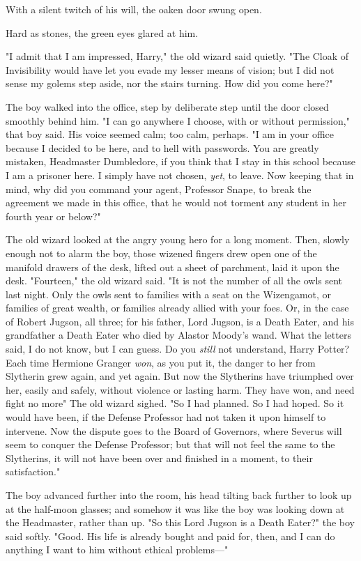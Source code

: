 With a silent twitch of his will, the oaken door swung open.

Hard as stones, the green eyes glared at him.

"I admit that I am impressed, Harry," the old wizard said quietly. "The Cloak
of Invisibility would have let you evade my lesser means of vision; but I did
not sense my golems step aside, nor the stairs turning. How did you come here?"

The boy walked into the office, step by deliberate step until the door closed
smoothly behind him. "I can go anywhere I choose, with or without permission,"
that boy said. His voice seemed calm; too calm, perhaps. "I am in your office
because I decided to be here, and to hell with passwords. You are greatly
mistaken, Headmaster Dumbledore, if you think that I stay in this school
because I am a prisoner here. I simply have not chosen, \emph{yet}, to leave.
Now keeping that in mind, why did you command your agent, Professor Snape, to
break the agreement we made in this office, that he would not torment any
student in her fourth year or below?"

The old wizard looked at the angry young hero for a long moment. Then, slowly
enough not to alarm the boy, those wizened fingers drew open one of the
manifold drawers of the desk, lifted out a sheet of parchment, laid it upon the
desk. "Fourteen," the old wizard said. "It is not the number of all the owls
sent last night. Only the owls sent to families with a seat on the Wizengamot,
or families of great wealth, or families already allied with your foes. Or, in
the case of Robert Jugson, all three; for his father, Lord Jugson, is a Death
Eater, and his grandfather a Death Eater who died by Alastor Moody's wand. What
the letters said, I do not know, but I can guess. Do you \emph{still} not
understand, Harry Potter? Each time Hermione Granger \emph{won}, as you put it,
the danger to her from Slytherin grew again, and yet again. But now the
Slytherins have triumphed over her, easily and safely, without violence or
lasting harm. They have won, and need fight no more{\el}" The old wizard
sighed. "So I had planned. So I had hoped. So it would have been, if the
Defense Professor had not taken it upon himself to intervene. Now the dispute
goes to the Board of Governors, where Severus will seem to conquer the Defense
Professor; but that will not feel the same to the Slytherins, it will not have
been over and finished in a moment, to their satisfaction."

The boy advanced further into the room, his head tilting back further to look
up at the half-moon glasses; and somehow it was like the boy was looking down
at the Headmaster, rather than up. "So this Lord Jugson is a Death Eater?" the
boy said softly. "Good. His life is already bought and paid for, then, and I
can do anything I want to him without ethical problems—"

